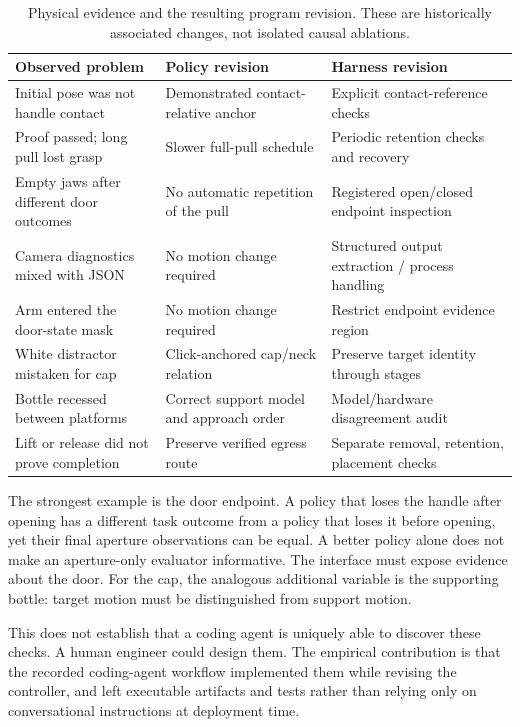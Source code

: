 \begin{table}[t]\centering\small
\caption{Physical evidence and the resulting program revision. These are
historically associated changes, not isolated causal ablations.}
\label{tab:changes}
\begin{tabularx}{\textwidth}{p{}YY}\toprule
Observed problem & Policy revision & Harness revision\\\midrule
Initial pose was not handle contact & Demonstrated contact-relative anchor & Explicit contact-reference checks\\
Proof passed; long pull lost grasp & Slower full-pull schedule & Periodic retention checks and recovery\\
Empty jaws after different door outcomes & No automatic repetition of the pull & Registered open/closed endpoint inspection\\
Camera diagnostics mixed with JSON & No motion change required & Structured output extraction / process handling\\
Arm entered the door-state mask & No motion change required & Restrict endpoint evidence region\\
White distractor mistaken for cap & Click-anchored cap/neck relation & Preserve target identity through stages\\
Bottle recessed between platforms & Correct support model and approach order & Model/hardware disagreement audit\\
Lift or release did not prove completion & Preserve verified egress route & Separate removal, retention, placement checks\\\bottomrule
\end{tabularx}
\end{table}

The strongest example is the door endpoint. A policy that loses the handle
after opening has a different task outcome from a policy that loses it before
opening, yet their final aperture observations can be equal. A better policy
alone does not make an aperture-only evaluator informative. The interface
must expose evidence about the door. For the cap, the analogous additional
variable is the supporting bottle: target motion must be distinguished from
support motion.

This does not establish that a coding agent is uniquely able to discover
these checks. A human engineer could design them. The empirical contribution
is that the recorded coding-agent workflow implemented them while revising
the controller, and left executable artifacts and tests rather than relying
only on conversational instructions at deployment time.

